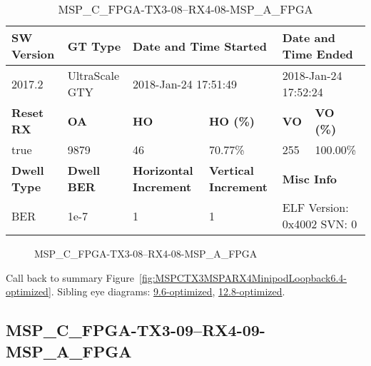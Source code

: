 \begin{table}[h]
\centering
\caption{MSP\_C\_FPGA-TX3-08--RX4-08-MSP\_A\_FPGA}
\label{tab:MSPCFPGATX308RX408MSPAFPGA6.4-optimized}
\begin{tabular}{@{}|l|l|l|l|l|l|@{}}
\toprule
\textbf{SW Version}                & \textbf{GT Type}   & \multicolumn{2}{l|}{\textbf{Date and Time Started}}            & \multicolumn{2}{l|}{\textbf{Date and Time Ended}}        \\ \midrule
2017.2                       & UltraScale GTY          & \multicolumn{2}{l|}{2018-Jan-24 17:51:49}                   & \multicolumn{2}{l|}{2018-Jan-24 17:52:24}               \\ \midrule
\textbf{Reset RX}                  & \textbf{OA} & \textbf{HO}   & \textbf{HO (\%)} & \textbf{VO} & \textbf{VO (\%)} \\ \midrule
true & 9879        & 46          & 70.77\%        & 255        & 100.00\%       \\ \midrule
\textbf{Dwell Type}                & \textbf{Dwell BER} & \textbf{Horizontal Increment} & \textbf{Vertical Increment}    & \multicolumn{2}{l|}{\textbf{Misc Info}}                  \\ \midrule
BER                            & 1e-7        & 1        & 1           & \multicolumn{2}{l|}{ELF Version: 0x4002 SVN: 0}                         \\ \bottomrule
\end{tabular}
\end{table}

\begin{figure}[h]
\caption{MSP\_C\_FPGA-TX3-08--RX4-08-MSP\_A\_FPGA} \label{fig:MSPCFPGATX308RX408MSPAFPGA6.4-optimized}
\end{figure}

Call back to summary Figure~\ref{fig:MSPCTX3MSPARX4MinipodLoopback6.4-optimized}.
Sibling eye diagrams: \hyperref[sec:MSPCFPGATX308RX408MSPAFPGA9.6-optimized]{9.6-optimized}, \hyperref[sec:MSPCFPGATX308RX408MSPAFPGA12.8-optimized]{12.8-optimized}.

\clearpage
\newpage


\subsection{MSP\_C\_FPGA-TX3-09--RX4-09-MSP\_A\_FPGA}\label{sec:MSPCFPGATX309RX409MSPAFPGA6.4-optimized}

